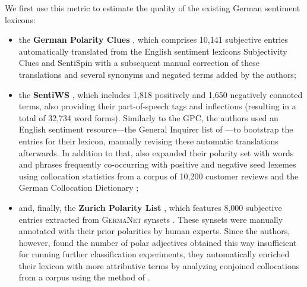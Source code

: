 We first use this metric to estimate the quality of the existing
German sentiment lexicons:
\begin{itemize}
\item the \textbf{German Polarity Clues} \cite[GPC;][]{Waltinger:10},
  which comprises 10,141 subjective entries automatically translated
  from the English sentiment lexicons Subjectivity Clues
  \cite{Wilson:05} and SentiSpin \cite{Takamura:05} with a subsequent
  manual correction of these translations and several synonyms and
  negated terms added by the authors;

\item the \textbf{SentiWS} \cite[SWS;][]{Remus:10}, which includes
  1,818 positively and 1,650 negatively connoted terms, also providing
  their part-of-speech tags and inflections (resulting in a total of
  32,734 word forms).  Similarly to the GPC, the authors used an
  English sentiment resource---the General Inquirer list of
  \citet{Stone:66}---to bootstrap the entries for their lexicon,
  manually revising these automatic translations afterwards.  In
  addition to that, \citet{Remus:10} also expanded their polarity set
  with words and phrases frequently co-occurring with positive and
  negative seed lexemes using collocation statistics from a corpus of
  10,200 customer reviews and the German Collocation Dictionary
  \cite{Quasthoff:10};

\item and, finally, the \textbf{Zurich Polarity List}
  \cite[ZPL;][]{Clematide:10}, which features 8,000 subjective entries
  extracted from \textsc{GermaNet} synsets \cite{Hamp:97}.  These
  synsets were manually annotated with their prior polarities by human
  experts.  Since the authors, however, found the number of polar
  adjectives obtained this way insufficient for running further
  classification experiments, they automatically enriched their
  lexicon with more attributive terms by analyzing conjoined
  collocations from a corpus using the method of
  \citet{Hatzivassi:97}.
\end{itemize}

